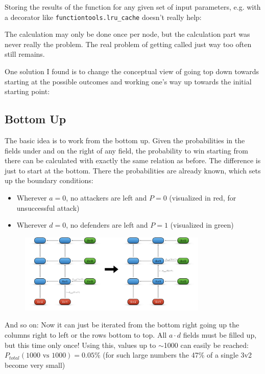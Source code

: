 \documentclass[11pt,a4paper]{article}
\begin{document}
Storing the results of the function for any given set of input parameters, e.g. with a decorator like \texttt{functiontools.lru\_cache} doesn't really help:

The calculation may only be done once per node, but the calculation part was never really the problem. The real problem of getting called just way too often still remains.

One solution I found is to change the conceptual view of going top down towards starting at the possible outcomes and working one's way up towards the initial starting point:

\subsection{Bottom Up}
The basic idea is to work from the bottom up. Given the probabilities in the fields under and on the right of any field, the probability to win starting from there can be calculated with exactly the same relation as before. The difference is just to start at the bottom. There the probabilities are already known, which sets up the boundary conditions:

\begin{itemize}
\item Wherever $a=0$, no attackers are left and $P=0$ (visualized in red, for unsuccessful attack)
\item Wherever $d=0$, no defenders are left and $P=1$ (visualized in green)
\end{itemize}

\begin{figure}[H]
\centering
\includegraphics[width=0.8\textwidth]{../images/bottom up transition.png}
\end{figure}

And so on: Now it can just be iterated from the bottom right going up the columns right to left or the rows bottom to top. All $a \cdot d$ fields must be filled up, but this time only once! Using this, values up to $\sim$1000 can easily be reached: $P_{total}(\text{1000 vs 1000}) = 0.05\%$ (for such large numbers the 47\% of a single 3v2 become very small)
\end{document}
